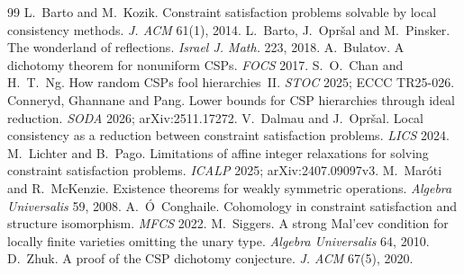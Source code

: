 \documentclass[11pt]{article}
\theoremstyle{definition}
\theoremstyle{remark}
\begin{document}
\begin{thebibliography}{99}
 L.~Barto and M.~Kozik. Constraint satisfaction problems
solvable by local consistency methods. \emph{J. ACM} 61(1), 2014.
 L.~Barto, J.~Opr\v{s}al and M.~Pinsker. The wonderland of
reflections. \emph{Israel J. Math.} 223, 2018.
 A.~Bulatov. A dichotomy theorem for nonuniform CSPs.
\emph{FOCS} 2017.
 S.~O.~Chan and H.~T.~Ng. How random CSPs fool hierarchies~II.
\emph{STOC} 2025; ECCC TR25-026.
 Conneryd, Ghannane and Pang. Lower bounds for CSP hierarchies
through ideal reduction. \emph{SODA} 2026; arXiv:2511.17272.
 V.~Dalmau and J.~Opr\v{s}al. Local consistency as a reduction
between constraint satisfaction problems. \emph{LICS} 2024.
 M.~Lichter and B.~Pago. Limitations of affine integer
relaxations for solving constraint satisfaction problems. \emph{ICALP} 2025;
arXiv:2407.09097v3.
 M.~Mar\'oti and R.~McKenzie. Existence theorems for weakly
symmetric operations. \emph{Algebra Universalis} 59, 2008.
 A.~\'O~Conghaile. Cohomology in constraint satisfaction and
structure isomorphism. \emph{MFCS} 2022.
 M.~Siggers. A strong Mal'cev condition for locally finite
varieties omitting the unary type. \emph{Algebra Universalis} 64, 2010.
 D.~Zhuk. A proof of the CSP dichotomy conjecture.
\emph{J. ACM} 67(5), 2020.
\end{thebibliography}
\end{document}
